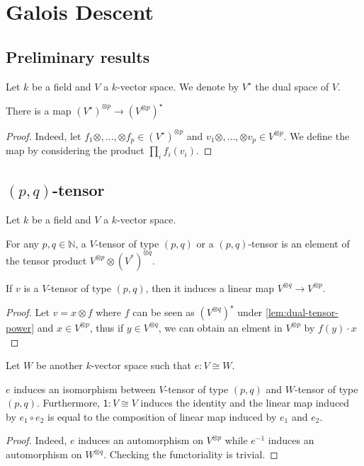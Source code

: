 \section{Galois Descent}

\subsection{Preliminary results}
Let $k$ be a field and $V$ a $k$-vector space. We denote by $V^{\star}$ the dual space of $V$.

\begin{lemma}\label{lem:dual-tensor-power}
  There is a map $(V^{\star})^{\otimes p} \to (V^{\otimes p})^\star$
  \leanok
\end{lemma}
\begin{proof}
Indeed, let $f_1 \otimes, \dots, \otimes f_p \in (V^{\star})^{\otimes p}$ and $v_1 \otimes, \dots, \otimes v_p \in V^{\otimes p}$. We define the map by considering the product $\prod_{i} f_i (v_i)$.
\end{proof}

\subsection{$(p, q)$-tensor}\label{sec:p-q-tensor}

Let $k$ be a field and $V$ a $k$-vector space.

\begin{definition}\label{def:tensor-of-type}%
  For any $p, q \in \mathbb{N}$, a $V$-tensor of type $(p,q)$ or a $(p, q)$-tensor is an element of the tensor product $V^{\otimes p} \otimes {(V^*)}^{\otimes q}$.
  \leanok%
\end{definition}


\begin{lemma}
  If $v$ is a $V$-tensor of type $(p,q)$, then it induces a linear map $V^{\otimes q}\to V^{\otimes p}$.
  \leanok%
\end{lemma}
\begin{proof}
  Let $v = x \otimes f$ where $f$ can be seen as ${(V^{\otimes q})}^{\star}$ under
  \cref{lem:dual-tensor-power} and $x \in V^{\otimes p}$, thus if $y \in V^{\otimes q}$, we can obtain an elment in $V^{\otimes p}$ by $f(y)\cdot x$
\end{proof}

Let $W$ be another $k$-vector space such that $e : V \cong W$.

\begin{lemma}\label{lem:tensor-of-type-congr}
  $e$ induces an isomorphism between $V$-tensor of type $(p,q)$ and $W$-tensor of type $(p, q)$. Furthermore, $\mathsf{1} : V \cong V$ induces the identity and the linear map induced by $e_{1}\circ e_{2}$ is equal to the composition of linear map induced by $e_{1}$ and $e_{2}$.
  \leanok%
\end{lemma}
\begin{proof}
  Indeed, $e$ induces an automorphism on $V^{\otimes p}$ while $e^{-1}$ induces an automorphism on $W^{\otimes q}$. Checking the functoriality is trivial.
\end{proof}

